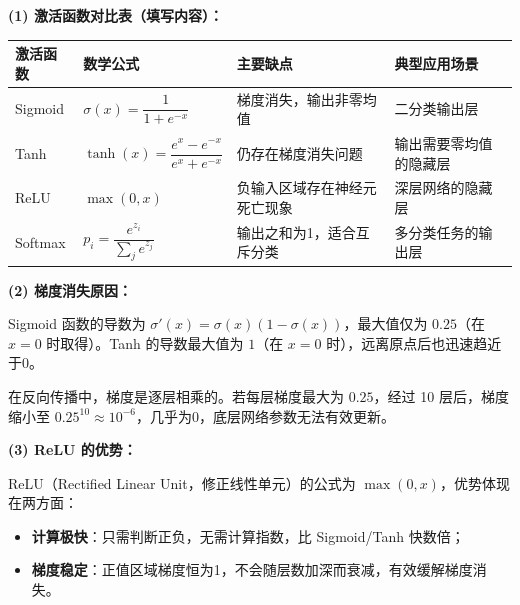 \documentclass[a4paper,11pt]{ctexart}
\begin{document}
\begin{solutionbox}[参考答案与详细解析]
    \textbf{(1) 激活函数对比表（填写内容）：}

    \begin{center}
    \begin{tabular}{p{2.0cm} p{4.0cm} p{3.5cm} p{3.5cm}}
        \toprule
        激活函数 & 数学公式 & 主要缺点 & 典型应用场景 \\
        \midrule
        Sigmoid & $\sigma(x)=\dfrac{1}{1+e^{-x}}$ & 梯度消失，输出非零均值 & 二分类输出层 \\[1.5em]
        Tanh & $\tanh(x)=\dfrac{e^x-e^{-x}}{e^x+e^{-x}}$ & 仍存在梯度消失问题 & 输出需要零均值的隐藏层 \\[1.5em]
        ReLU & $\max(0, x)$ & 负输入区域存在神经元死亡现象 & 深层网络的隐藏层 \\[1.5em]
        Softmax & $p_i=\dfrac{e^{z_i}}{\sum_j e^{z_j}}$ & 输出之和为1，适合互斥分类 & 多分类任务的输出层 \\
        \bottomrule
    \end{tabular}
    \end{center}

    \textbf{(2) 梯度消失原因：}

    Sigmoid 函数的导数为 $\sigma'(x) = \sigma(x)(1-\sigma(x))$，最大值仅为 $0.25$（在 $x=0$ 时取得）。Tanh 的导数最大值为 $1$（在 $x=0$ 时），远离原点后也迅速趋近于0。

    在反向传播中，梯度是逐层相乘的。若每层梯度最大为 $0.25$，经过 10 层后，梯度缩小至 $0.25^{10} \approx 10^{-6}$，几乎为0，底层网络参数无法有效更新。

    \textbf{(3) ReLU 的优势：}

    ReLU（Rectified Linear Unit，修正线性单元）的公式为 $\max(0,x)$，优势体现在两方面：
    \begin{itemize}
        \item \textbf{计算极快}：只需判断正负，无需计算指数，比 Sigmoid/Tanh 快数倍；
        \item \textbf{梯度稳定}：正值区域梯度恒为1，不会随层数加深而衰减，有效缓解梯度消失。
    \end{itemize}
\end{solutionbox}
\end{document}
